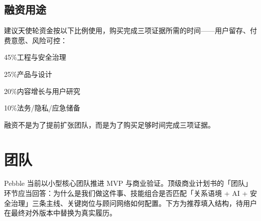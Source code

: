 \documentclass[UTF8,11pt,a4paper]{ctexart}
\begin{document}
\subsection{融资用途}

建议天使轮资金按以下比例使用，购买完成三项证据所需的时间——用户留存、付费意愿、风险可控：

\vspace{2mm}
\begin{tcbraster}[raster columns=4, raster equal height, raster column skip=3mm]
  \begin{kpicard}{45\%}{工程与安全治理}\end{kpicard}
  \begin{kpicard}{25\%}{产品与设计}\end{kpicard}
  \begin{kpicard}{20\%}{内容增长与用户研究}\end{kpicard}
  \begin{kpicard}{10\%}{法务/隐私/应急储备}\end{kpicard}
\end{tcbraster}

\vspace{1mm}
{\footnotesize\color{PebbleMute}融资不是为了提前扩张团队，而是为了购买足够时间完成三项证据。}

\section{团队}

Pebble 当前以小型核心团队推进 MVP 与商业验证。顶级商业计划书的「团队」环节应当回答：为什么是我们做这件事、技能组合是否匹配「关系语境 + AI + 安全治理」三条主线、关键岗位与顾问网络如何配置。下方为推荐填入结构，待用户在最终对外版本中替换为真实履历。
\end{document}
